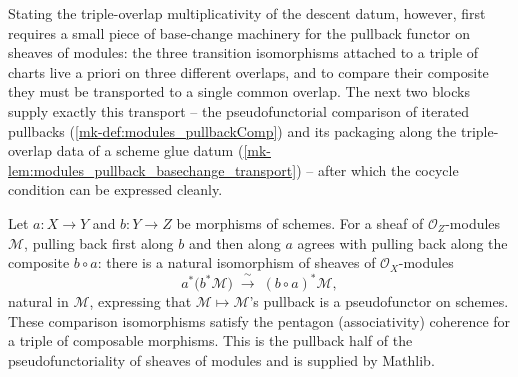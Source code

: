 Stating the triple-overlap multiplicativity of the descent datum, however, first
requires a small piece of base-change machinery for the pullback functor on sheaves
of modules: the three transition isomorphisms attached to a triple of charts live a
priori on three different overlaps, and to compare their composite they must be
transported to a single common overlap. The next two blocks supply exactly this
transport -- the pseudofunctorial comparison of iterated pullbacks
(\ref{mk-def:modules_pullbackComp}) and its packaging along the triple-overlap data of a
scheme glue datum (\ref{mk-lem:modules_pullback_basechange_transport}) -- after which the
cocycle condition can be expressed cleanly.

\begin{definition}
  \label{mk-def:modules_pullbackComp}
  \mathlibok

  Let \(a : X \to Y\) and \(b : Y \to Z\) be morphisms of schemes. For a sheaf of
  \(\mathcal{O}_Z\)-modules \(\mathcal{M}\), pulling back first along \(b\) and then
  along \(a\) agrees with pulling back along the composite \(b \circ a\): there is a
  natural isomorphism of sheaves of \(\mathcal{O}_X\)-modules
  \[
    a^{*}\bigl(b^{*}\mathcal{M}\bigr)
      \;\xrightarrow{\ \sim\ }\;
    (b \circ a)^{*}\mathcal{M},
  \]
  natural in \(\mathcal{M}\), expressing that \(\mathcal{M} \mapsto \mathcal{M}\)'s
  pullback is a pseudofunctor on schemes. These comparison isomorphisms satisfy the
  pentagon (associativity) coherence for a triple of composable morphisms. This is the
  pullback half of the pseudofunctoriality of sheaves of modules and is supplied by
  Mathlib.
\end{definition}

